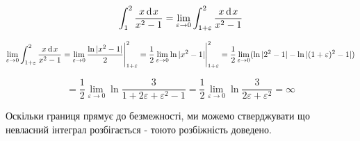 {}

$$
  \int^2_1 \dfrac{x\hspace{2pt}\text{d}\hspace{1pt}{x}}{x^2-1} =
  \lim_{\varepsilon \to 0} \int^2_{1+\varepsilon} \dfrac{x\hspace{2pt}\text{d}\hspace{1pt}{x}}{x^2-1}
$$


$$
\lim_{\varepsilon \to 0} \int^2_{1+\varepsilon} \dfrac{x\hspace{2pt}\text{d}\hspace{1pt}{x}}{x^2-1}
=  \lim_{\varepsilon \to 0}  \dfrac{\ln{|x^2-1|}}{2}  \Bigg|^2_{1+\varepsilon}
=  \dfrac{1}{2} \lim_{\varepsilon \to 0} \ln{|x^2-1|} \Bigg|^2_{1+\varepsilon}
=  \dfrac{1}{2} \lim_{\varepsilon \to 0} ( \ln{|2^2-1|} - \ln{|(1+\varepsilon)^2-1|} )
$$

$$
= \dfrac{1}{2} \lim_{\varepsilon \to 0} \ln{\dfrac{3}{1+2\varepsilon+\varepsilon^2-1}}
= \dfrac{1}{2} \lim_{\varepsilon \to 0} \ln{\dfrac{3}{2\varepsilon+\varepsilon^2}}
= \infty
$$

Оскільки границя прямує до безмежності, ми можемо стверджувати що невласний інтеграл розбігається - тоюто розбіжність доведено.
